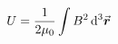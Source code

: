 

\vspace*{\fill}
\centering

\begin{align*}
    U = \frac{1}{2 \mu_0} \int B^2 \dd[3]{\va*{r}}
\end{align*}

\centering
\vspace*{\fill}

